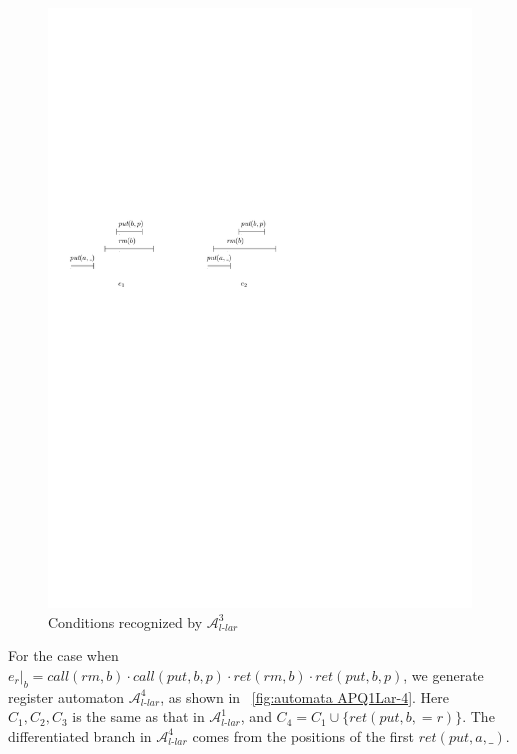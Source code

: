 \begin{figure}[htbp]
  \centering
  \includegraphics[width=0.7 \textwidth]{figures/PIC_HIS_PQ1Lar-rppr.pdf}
  \caption{Conditions recognized by $\mathcal{A}_{\textit{l-lar}}^3$}
  \label{fig:his for APQ1Lar-3}
\end{figure}


For the case when $e_r \vert_{b} = \textit{call}(\textit{rm},b) \cdot \textit{call}(\textit{put},b,p) \cdot \textit{ret}(\textit{rm},b) \cdot \textit{ret}(\textit{put},b,p)$, we generate register automaton $\mathcal{A}_{\textit{l-lar}}^4$, as shown in \figurename~\ref{fig:automata APQ1Lar-4}. Here $C_1,C_2,C_3$ is the same as that in $\mathcal{A}_{\textit{l-lar}}^1$, and $C_4 = C_1 \cup \{ \textit{ret}(\textit{put},b,=r) \}$. The differentiated branch in $\mathcal{A}_{\textit{l-lar}}^4$ comes from the positions of the first $\textit{ret}(\textit{put},a,\_)$.

